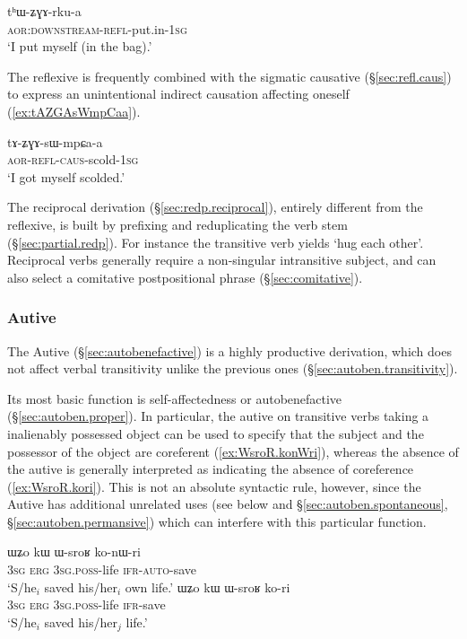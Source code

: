 \begin{exe}
\ex \label{ex:thWZGArkua}
\gll  tʰɯ-ʑɣɤ-rku-a \\
\textsc{aor}:\textsc{downstream}-\textsc{refl}-put.in-\textsc{1sg} \\
\glt `I put myself (in the bag).'
\end{exe}
  
 The reflexive is frequently combined with the sigmatic causative (§\ref{sec:refl.caus}) to express an unintentional indirect causation affecting oneself (\ref{ex:tAZGAsWmpCaa}).
 
\begin{exe}
\ex \label{ex:tAZGAsWmpCaa}
\gll tɤ-ʑɣɤ-sɯ-mpɕa-a \\
\textsc{aor}-\textsc{refl}-\textsc{caus}-scold-\textsc{1sg} \\
\glt `I got myself scolded.' 
\end{exe}
 
The reciprocal derivation (§\ref{sec:redp.reciprocal}), entirely different from the reflexive, is built by prefixing  and reduplicating the verb stem (§\ref{sec:partial.redp}). For instance the transitive verb  yields  `hug each other'. Reciprocal verbs generally require a non-singular intransitive subject, and can also select a comitative postpositional phrase (§\ref{sec:comitative}).

\subsubsection{Autive}
The Autive  (§\ref{sec:autobenefactive}) is a highly productive derivation, which 
does not affect verbal transitivity unlike the previous ones (§\ref{sec:autoben.transitivity}). 

Its most basic function is self-affectedness or autobenefactive (§\ref{sec:autoben.proper}). In particular, the autive on transitive verbs taking a inalienably possessed object can be used to specify that the subject and the possessor of the object are coreferent (\ref{ex:WsroR.konWri}), whereas the absence of the autive is generally interpreted as indicating the absence of coreference (\ref{ex:WsroR.kori}). This is not an absolute syntactic rule, however, since the Autive has additional unrelated uses (see below and §\ref{sec:autoben.spontaneous}, §\ref{sec:autoben.permansive}) which can interfere with this particular function.

\begin{exe}
\ex 
\begin{xlist}
\ex \label{ex:WsroR.konWri}
\gll ɯʑo kɯ ɯ-sroʁ ko-nɯ-ri  \\
\textsc{3sg} \textsc{erg} \textsc{3sg}.\textsc{poss}-life \textsc{ifr}-\textsc{auto}-save  \\
\glt `S/he$_i$ saved his/her$_i$ own life.' 
\ex \label{ex:WsroR.kori}
\gll ɯʑo kɯ ɯ-sroʁ ko-ri  \\
\textsc{3sg} \textsc{erg} \textsc{3sg}.\textsc{poss}-life \textsc{ifr}-save  \\
\glt `S/he$_i$ saved his/her$_j$ life.'
\end{xlist}
\end{exe}

